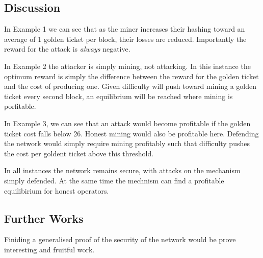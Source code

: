 \documentclass[
]{article}
\begin{document}
\hypertarget{discussion}{%
\subsection{Discussion}\label{discussion}}

In Example 1 we can see that as the miner increases their hashing toward
an average of 1 golden ticket per block, their losses are reduced.
Importantly the reward for the attack is \emph{always} negative.

In Example 2 the attacker is simply mining, not attacking. In this
instance the optimum reward is simply the difference between the reward
for the golden ticket and the cost of producing one. Given difficulty
will push toward mining a golden ticket every second block, an
equilibrium will be reached where mining is porfitable.

In Example 3, we can see that an attack would become profitable if the
golden ticket cost falls below 26. Honest mining would also be
profitable here. Defending the network would simply require mining
profitably such that difficulty pushes the cost per goldent ticket above
this threshold.

In all instances the network remains secure, with attacks on the
mechanism simply defended. At the same time the mechnism can find a
profitable equilibirium for honest operators.

\hypertarget{further-works}{%
\subsection{Further Works}\label{further-works}}

Finiding a generalised proof of the security of the network would be
prove interesting and fruitful work.
\end{document}
